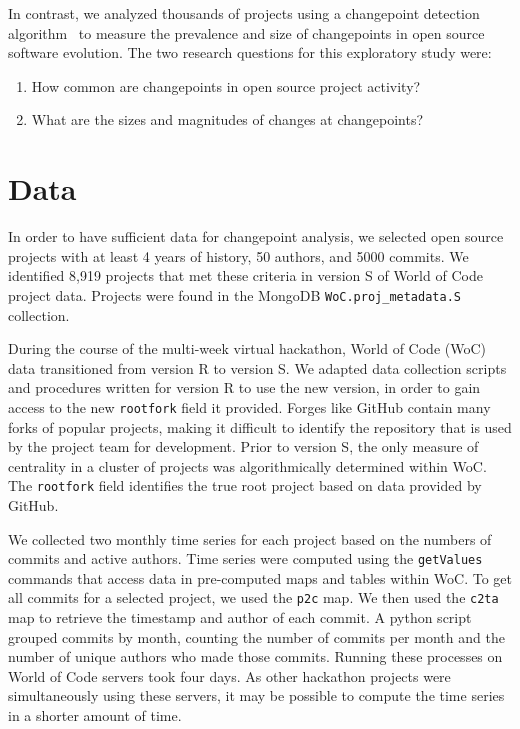 \documentclass[10pt,conference]{IEEEtran}
\begin{document}

In contrast, we analyzed thousands of projects using a changepoint detection algorithm~\cite{van2020evaluation} to measure the prevalence and size of changepoints in open source software evolution. The two research questions for this exploratory study were:
\begin{enumerate}
    \item How common are changepoints in open source project activity?
    \item What are the sizes and magnitudes of changes at changepoints?
\end{enumerate}

\section{Data}

In order to have sufficient data for changepoint analysis, we selected open source projects with at least 4 years of history, 50 authors, and 5000 commits. We identified 8,919 projects that met these criteria in version S of World of Code project data. Projects were found in the MongoDB \texttt{WoC.proj\_metadata.S} collection.

During the course of the multi-week virtual hackathon, World of Code (WoC) data transitioned from version R to version S. We adapted data collection scripts and procedures written for version R to use the new version, in order to gain access to the new \texttt{rootfork} field it provided. Forges like GitHub contain many forks of popular projects, making it difficult to identify the repository that is used by the project team for development. Prior to version S, the only measure of centrality in a cluster of projects was algorithmically determined within WoC. The \texttt{rootfork} field identifies the true root project based on data provided by GitHub.

We collected two monthly time series for each project based on the numbers of commits and active authors. Time series were computed using the \texttt{getValues} commands that access data in pre-computed maps and tables within WoC. To get all commits for a selected project, we used the \texttt{p2c} map. We then used the \texttt{c2ta} map to retrieve the timestamp and author of each commit. A python script grouped commits by month, counting the number of commits per month and the number of unique authors who made those commits. Running these processes on World of Code servers took four days. As other hackathon projects were simultaneously using these servers, it may be possible to compute the time series in a shorter amount of time.
\end{document}
